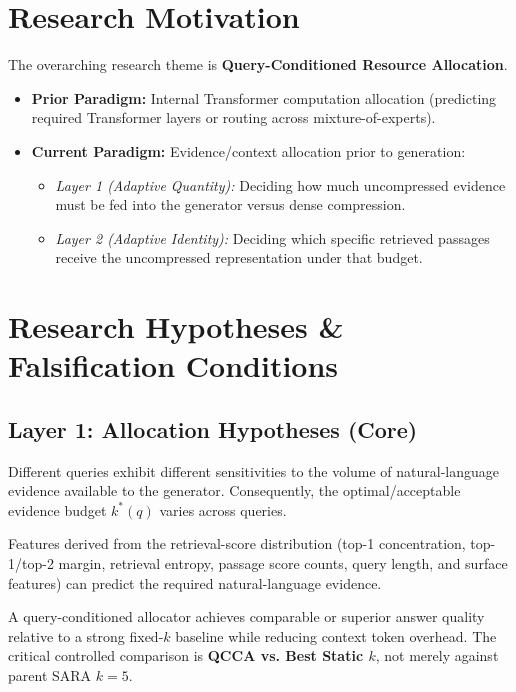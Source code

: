 \documentclass[11pt,a4paper]{article}
\begin{document}
\section{Research Motivation}
The overarching research theme is \textbf{Query-Conditioned Resource Allocation}.
\begin{itemize}
    \item \textbf{Prior Paradigm:} Internal Transformer computation allocation (predicting required Transformer layers or routing across mixture-of-experts).
    \item \textbf{Current Paradigm:} Evidence/context allocation prior to generation:
    \begin{itemize}
        \item \textit{Layer 1 (Adaptive Quantity):} Deciding how much uncompressed evidence must be fed into the generator versus dense compression.
        \item \textit{Layer 2 (Adaptive Identity):} Deciding which specific retrieved passages receive the uncompressed representation under that budget.
    \end{itemize}
\end{itemize}

\section{Research Hypotheses \& Falsification Conditions}

\subsection{Layer 1: Allocation Hypotheses (Core)}
\begin{hypothesisbox}
Different queries exhibit different sensitivities to the volume of natural-language evidence available to the generator. Consequently, the optimal/acceptable evidence budget $k^*(q)$ varies across queries.
\end{hypothesisbox}

\begin{hypothesisbox}
Features derived from the retrieval-score distribution (top-1 concentration, top-1/top-2 margin, retrieval entropy, passage score counts, query length, and surface features) can predict the required natural-language evidence.
\end{hypothesisbox}

\begin{hypothesisbox}
A query-conditioned allocator achieves comparable or superior answer quality relative to a strong fixed-$k$ baseline while reducing context token overhead. The critical controlled comparison is \textbf{QCCA vs. Best Static $k$}, not merely against parent SARA $k=5$.
\end{hypothesisbox}
\end{document}
